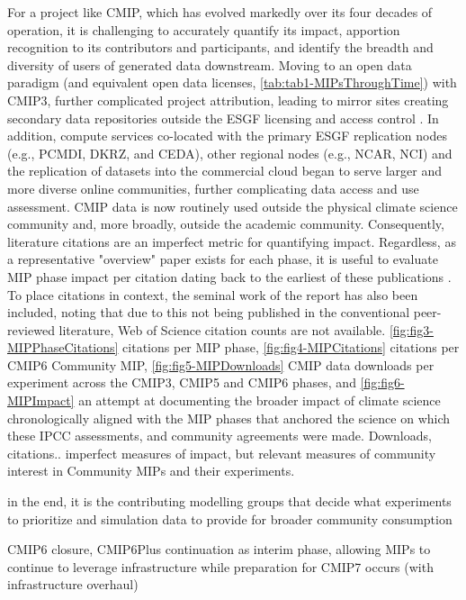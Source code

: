 \documentclass[gmd, preprint]{copernicus}
\def\cred#1{{\color{red}#1}}
\begin{document}
\cred{
For a project like CMIP, which has evolved markedly over its four decades of operation, it is challenging to accurately quantify its impact, apportion recognition to its contributors and participants, and identify the breadth and diversity of users of generated data downstream. Moving to an open data paradigm (and equivalent open data licenses, \autoref{tab:tab1-MIPsThroughTime}) with CMIP3, further complicated project attribution, leading to mirror sites creating secondary data repositories outside the ESGF licensing and access control \citep{balaji_requirements_2018}. In addition, compute services co-located with the primary ESGF replication nodes (e.g., PCMDI, DKRZ, and CEDA), other regional nodes (e.g., NCAR, NCI) and the replication of datasets into the commercial cloud \citep[e.g., PANGEO;][]{abernathey_cmip6_2020} began to serve larger and more diverse online communities, further complicating data access and use assessment.
}
\cred{
CMIP data is now routinely used outside the physical climate science community and, more broadly, outside the academic community. Consequently, literature citations are an imperfect metric for quantifying impact. Regardless, as a representative "overview" paper exists for each phase, it is useful to evaluate MIP phase impact per citation dating back to the earliest of these publications \citep[FANGIO;][]{cess_intercomparison_1990}. To place citations in context, the seminal work of the \citep{charney_carbon_1979} report has also been included, noting that due to this not being published in the conventional peer-reviewed literature, Web of Science citation counts are not available. 
}
\cred{
\autoref{fig:fig3-MIPPhaseCitations} citations per MIP phase, \autoref{fig:fig4-MIPCitations} citations per CMIP6 Community MIP, \autoref{fig:fig5-MIPDownloads} CMIP data downloads per experiment across the CMIP3, CMIP5 and CMIP6 phases, and \autoref{fig:fig6-MIPImpact} an attempt at documenting the broader impact of climate science chronologically aligned with the MIP phases that anchored the science on which these IPCC assessments, and community agreements were made.
}
\cred{
Downloads, citations.. imperfect measures of impact, but relevant measures of community interest in Community MIPs and their experiments.
}

in the end, it is the contributing modelling groups that decide what experiments to prioritize and simulation data to provide for broader community consumption

\cred{
CMIP6 closure, CMIP6Plus continuation as interim phase, allowing MIPs to continue to leverage infrastructure while preparation for CMIP7 occurs (with infrastructure overhaul)
}
\end{document}
